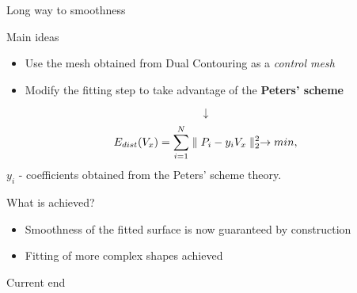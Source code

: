 \begin{frame}{Long way to smoothness}
\begin{block}{Main ideas}
\begin{itemize}
\item Use the mesh obtained from Dual Contouring as a \textit{control mesh}
\item Modify the fitting step to take advantage of the \textbf{Peters' scheme}
\end{itemize}
\end{block}
$$\downarrow$$
\begin{equation*}
E_{dist}(V_{x}) = \sum_{i=1}^{N}\norm{P_{i} - y_{i}V_{x}}^{2} \rightarrow min,
\end{equation*}
$y_{i}$ - coefficients obtained from the Peters' scheme theory.
\pause
\begin{block}{What is achieved?}
\begin{itemize}
\item Smoothness of the fitted surface is now guaranteed by construction
\item Fitting of more complex shapes achieved
\end{itemize}
\end{block}
\end{frame}

\begin{frame}
Current end
\end{frame}


